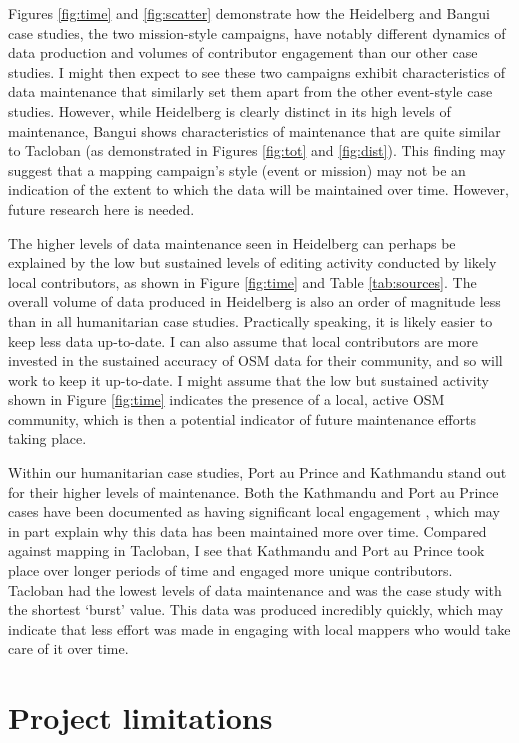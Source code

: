 Figures \ref{fig:time} and \ref{fig:scatter} demonstrate how the Heidelberg and Bangui case studies, the two mission-style campaigns, have notably different dynamics of data production and volumes of contributor engagement than our other case studies. I might then expect to see these two campaigns exhibit characteristics of data maintenance that similarly set them apart from the other event-style case studies. However, while Heidelberg is clearly distinct in its high levels of maintenance, Bangui shows characteristics of maintenance that are quite similar to Tacloban (as demonstrated in Figures \ref{fig:tot} and \ref{fig:dist}). This finding may suggest that a mapping campaign’s style (event or mission) may not be an indication of the extent to which the data will be maintained over time. However, future research here is needed. 

The higher levels of data maintenance seen in Heidelberg can perhaps be explained by the low but sustained levels of editing activity conducted by likely local contributors, as shown in Figure \ref{fig:time} and Table \ref{tab:sources}. The overall volume of data produced in Heidelberg is also an order of magnitude less than in all humanitarian case studies. Practically speaking, it is likely easier to keep less data up-to-date. I can also assume that local contributors are more invested in the sustained accuracy of OSM data for their community, and so will work to keep it up-to-date. I might assume that the low but sustained activity shown in Figure \ref{fig:time} indicates the presence of a local, active OSM community, which is then a potential indicator of future maintenance efforts taking place. 

Within our humanitarian case studies, Port au Prince and Kathmandu stand out for their higher levels of maintenance. Both the Kathmandu and Port au Prince cases have been documented as having significant local engagement \parencite{soden_crowdsourced_2014}, which may in part explain why this data has been maintained more over time. Compared against mapping in Tacloban, I see that Kathmandu and Port au Prince took place over longer periods of time and engaged more unique contributors. Tacloban had the lowest levels of data maintenance and was the case study with the shortest ‘burst’ value. This data was produced incredibly quickly, which may indicate that less effort was made in engaging with local mappers who would take care of it over time. 

\section{Project limitations}

